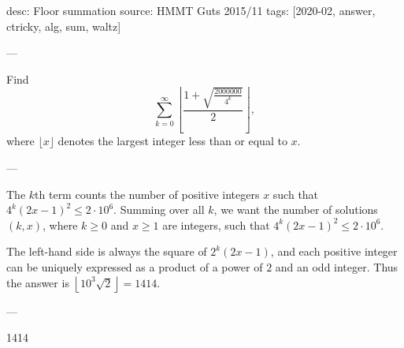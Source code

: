 desc: Floor summation
source: HMMT Guts 2015/11
tags: [2020-02, answer, ctricky, alg, sum, waltz]

---

Find \[\sum_{k=0}^\infty\left\lfloor\frac{1+\sqrt{\frac{2000000}{4^k}}}2\right\rfloor,\]
where $\lfloor x\rfloor$ denotes the largest integer less than or equal to $x$.

---

The $k$th term counts the number of positive integers $x$ such that $4^k(2x-1)^2\le2\cdot10^6$. Summing over all $k$, we want the number of solutions $(k,x)$, where $k\ge0$ and $x\ge1$ are integers, such that $4^k(2x-1)^2\le2\cdot10^6$.

The left-hand side is always the square of $2^k(2x-1)$, and each positive integer can be uniquely expressed as a product of a power of $2$ and an odd integer. Thus the answer is $\left\lfloor10^3\sqrt2\right\rfloor=1414$.

---

1414
